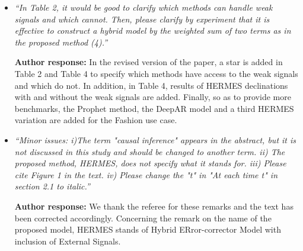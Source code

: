 \documentclass[10pt]{article} %
\begin{document}
\begin{itemize}
	\item {\em ``In Table 2, it would be good to clarify which methods can handle weak signals and which cannot. Then, please clarify by experiment that it is effective to construct a hybrid model by the weighted sum of two terms as in the proposed method (4).''} \medskip

	\textbf{Author response:}  In the revised version of the paper, a star is added in Table 2 and Table 4 to specify which methods have access to the weak signals and which do not. In addition, in Table 4, results of HERMES declinations with and without the weak signals are added. Finally, so as to provide more benchmarks, the Prophet method, the DeepAR model and a third HERMES variation are added for the Fashion use case.\\
	
	\item {\em ``Minor issues: i)The term "causal inference" appears in the abstract, but it is not discussed in this study and should be changed to another term. ii) The proposed method, HERMES, does not specify what it stands for. iii) Please cite Figure 1 in the text. iv) Please change the "t" in "At each time t" in section 2.1 to italic.''} \medskip

	\textbf{Author response:} We thank the referee for these remarks and the text has been corrected accordingly. Concerning the remark on the name of the proposed model, HERMES stands of Hybrid ERror-corrector Model with inclusion of External Signals.\\	
\end{itemize}
\end{document}
